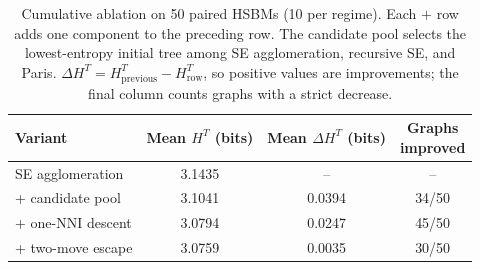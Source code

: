 \begin{table}[t]
\centering\small
\caption{Cumulative \NEST ablation on 50 paired HSBMs (10 per regime). Each $+$ row adds one
component to the preceding row. The candidate pool selects the lowest-entropy
initial tree among SE agglomeration, recursive SE, and Paris.
$\Delta H^T=H^T_{\mathrm{previous}}-H^T_{\mathrm{row}}$, so positive values are
improvements; the final column counts graphs with a strict decrease.}
\label{tab:ablation}
\begin{tabular*}{0.88\textwidth}{@{\extracolsep{\fill}}lccc@{}}
\toprule
Variant
& \shortstack{Mean $H^T$\\(bits)}
& \shortstack{Mean $\Delta H^T$\\(bits)}
& \shortstack{Graphs\\improved} \\
\midrule
SE agglomeration & 3.1435 & -- & -- \\
+ candidate pool & 3.1041 & 0.0394 & 34/50 \\
+ one-NNI descent & 3.0794 & 0.0247 & 45/50 \\
+ two-move escape & 3.0759 & 0.0035 & 30/50 \\
\bottomrule
\end{tabular*}
\end{table}
